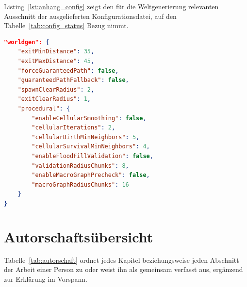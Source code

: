 \documentclass[
  a4paper,
  11pt,
  twoside,
  BCOR=8mm,           %
  headings=big,
  numbers=noenddot,
  listof=totoc,       %
  captions=tableheading,
]{scrreprt}
\begin{document}
Listing~\ref{lst:anhang_config} zeigt den für die Weltgenerierung relevanten Ausschnitt der ausgelieferten Konfigurationsdatei, auf den Tabelle~\ref{tab:config_status} Bezug nimmt.

\begin{lstlisting}[language=json, caption={Weltgenerierungs-Konfiguration (Auszug)}, label={lst:anhang_config}]
"worldgen": {
    "exitMinDistance": 35,
    "exitMaxDistance": 45,
    "forceGuaranteedPath": false,
    "guaranteedPathFallback": false,
    "spawnClearRadius": 2,
    "exitClearRadius": 1,
    "procedural": {
        "enableCellularSmoothing": false,
        "cellularIterations": 2,
        "cellularBirthMinNeighbors": 5,
        "cellularSurvivalMinNeighbors": 4,
        "enableFloodFillValidation": false,
        "validationRadiusChunks": 8,
        "enableMacroGraphPrecheck": false,
        "macroGraphRadiusChunks": 16
    }
}
\end{lstlisting}

\chapter{Autorschaftsübersicht}
\label{chap:anhang_autorschaft}

Tabelle~\ref{tab:autorschaft} ordnet jedes Kapitel beziehungsweise jeden Abschnitt der Arbeit einer Person zu oder weist ihn als gemeinsam verfasst aus, ergänzend zur Erklärung im Vorspann.
\end{document}
